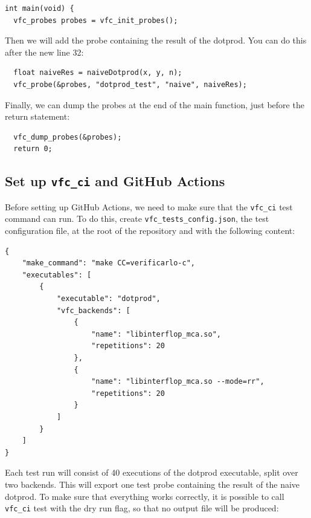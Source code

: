 \bigbreak

\begin{verbatim}
int main(void) {
  vfc_probes probes = vfc_init_probes();
\end{verbatim}

Then we will add the probe containing the result of the dotprod. You can do this after the new line 32:

\bigbreak

\begin{verbatim}
  float naiveRes = naiveDotprod(x, y, n);
  vfc_probe(&probes, "dotprod_test", "naive", naiveRes);
\end{verbatim}

Finally, we can dump the probes at the end of the main function, just before the return statement:

\bigbreak

\begin{verbatim}
  vfc_dump_probes(&probes);
  return 0;
\end{verbatim}


\subsection{Set up \texttt{vfc\_ci} and GitHub Actions}

Before setting up GitHub Actions, we need to make sure that the \texttt{vfc_ci} test command can run. To do this, create \texttt{vfc_tests_config.json}, the test configuration file, at the root of the repository and with the following content:

\bigbreak

\begin{verbatim}
{
    "make_command": "make CC=verificarlo-c",
    "executables": [
        {
            "executable": "dotprod",
            "vfc_backends": [
                {
                    "name": "libinterflop_mca.so",
                    "repetitions": 20
                },
                {
                    "name": "libinterflop_mca.so --mode=rr",
                    "repetitions": 20
                }
            ]
        }
    ]
}
\end{verbatim}

Each test run will consist of 40 executions of the dotprod executable, split over two backends. This will export one test probe containing the result of the naive dotprod. To make sure that everything works correctly, it is possible to call \texttt{vfc_ci} test with the dry run flag, so that no output file will be produced:

